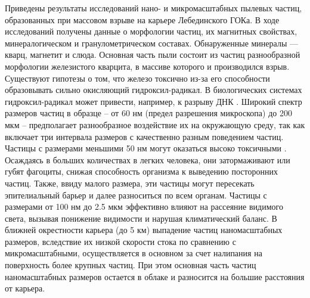 Приведены результаты исследований нано- и микромасштабных пылевых частиц, образованных при массовом взрыве на карьере Лебединского ГОКа. В ходе исследований получены данные о морфологии частиц, их магнитных свойствах, минералогическом и гранулометрическом составах. Обнаруженные минералы — кварц, магнетит и слюда. Основная часть пыли состоит из частиц разнообразной морфологии железистого кварцита, в массиве которого и производился взрыв. Существуют гипотезы о том, что железо токсично из-за его способности образовывать сильно окисляющий гидроксил-радикал. В биологических системах гидроксил-радикал может привести, например, к разрыву ДНК \cite{bib17}. Широкий спектр размеров частиц в образце – от 60 нм (предел разрешения микроскопа) до 200 мкм – предполагает разнообразное воздействие их на окружающую среду, так как включает три интервала размеров с качественно разным поведением частиц. Частицы с размерами меньшими 50 нм могут оказаться высоко токсичными \cite{bib06}. Осаждаясь в больших количествах в легких человека, они затормаживают или губят фагоциты, снижая способность организма к выведению посторонних частиц. Также, ввиду малого размера, эти частицы могут пересекать эпителиальный барьер и далее разноситься по всем органам. Частицы с размерами от 100 нм до 2.5 мкм эффективно влияют на рассеяние видимого света, вызывая понижение видимости и нарушая климатический баланс. В ближней окрестности карьера (до 5 км) выпадение частиц наномасштабных размеров, вследствие их низкой скорости стока по сравнению с микромасштабными, осуществляется в основном за счет налипания на поверхность более крупных частиц. При этом основная часть частиц наномасштабных размеров остается в облаке и разносится на большие расстояния от карьера.



\clearpage